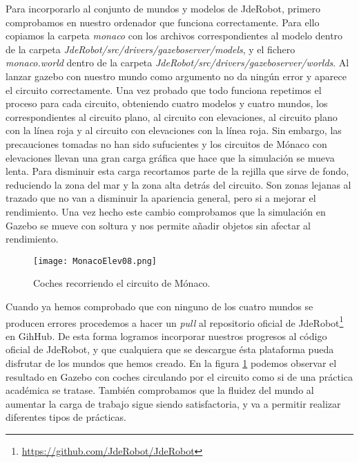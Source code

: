 Para incorporarlo al conjunto de mundos y modelos de JdeRobot, primero comprobamos en nuestro ordenador que funciona correctamente. Para ello copiamos la carpeta \textit{monaco} con los archivos correspondientes al modelo dentro de la carpeta \textit{JdeRobot/src/drivers/gazeboserver/models}, y el fichero \textit{monaco.world} dentro de la carpeta \textit{JdeRobot/src/drivers/gazeboserver/worlds}. Al lanzar gazebo con nuestro mundo como argumento no da ningún error y aparece el circuito correctamente. Una vez probado que todo funciona repetimos el proceso para cada circuito, obteniendo cuatro modelos y cuatro mundos, los correspondientes al circuito plano, al circuito con elevaciones, al circuito plano con la línea roja y al circuito con elevaciones con la línea roja. Sin embargo, las precauciones tomadas no han sido sufucientes y los circuitos de Mónaco con elevaciones llevan una gran carga gráfica que hace que la simulación se mueva lenta. Para disminuir esta carga recortamos parte de la rejilla que sirve de fondo, reduciendo la zona del mar y la zona alta detrás del circuito. Son zonas lejanas al trazado que no van a disminuir la apariencia general, pero si a mejorar el rendimiento. Una vez hecho este cambio comprobamos que la simulación en Gazebo se mueve con soltura y nos permite añadir objetos sin afectar al rendimiento. 

\begin{figure}[h]
	\centering
	\texttt{[image: MonacoElev08.png]}
	\caption{Coches recorriendo el circuito de Mónaco.} \label{fig:monacocoches}
\end{figure}

Cuando ya hemos comprobado que con ninguno de los cuatro mundos se producen errores procedemos a hacer un \textit{pull} al repositorio oficial de JdeRobot\footnote{\url{https://github.com/JdeRobot/JdeRobot}} en GihHub. De esta forma logramos incorporar nuestros progresos al código oficial de JdeRobot, y que cualquiera que se descargue ésta plataforma pueda disfrutar de los mundos que hemos creado. En la figura \ref{fig:monacocoches} podemos observar el resultado en Gazebo con coches circulando por el circuito como si de una práctica académica se tratase. También comprobamos que la fluidez del mundo al aumentar la carga de trabajo sigue siendo satisfactoria, y va a permitir realizar diferentes tipos de prácticas.

